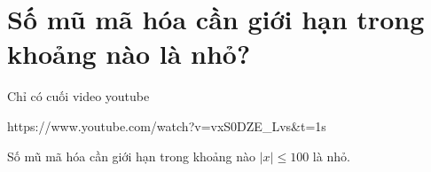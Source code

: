 \documentclass{article}
\begin{document}
 


\section{Số mũ mã hóa cần giới hạn trong khoảng nào là nhỏ?}








Chỉ có cuối video  youtube

https://www.youtube.com/watch?v=vxS0DZE_Lvs&t=1s


Số mũ mã hóa cần giới hạn trong khoảng nào $|x| \leq 100$ là nhỏ.




\end{document}
